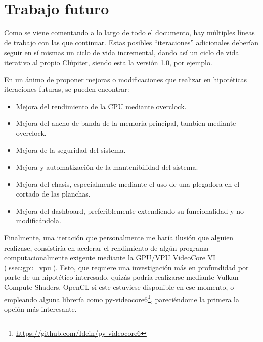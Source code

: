 \section{Trabajo futuro}
Como se viene comentando a lo largo de todo el documento, hay múltiples líneas de trabajo con las que continuar. Estas posibles ``iteraciones'' adicionales deberían seguir en sí mismas un ciclo de vida incremental, dando así un ciclo de vida iterativo al propio Clúpiter, siendo esta la versión 1.0, por ejemplo.

En un ánimo de proponer mejoras o modificaciones que realizar en hipotéticas iteraciones futuras, se pueden encontrar:
\begin{itemize}
    \item Mejora del rendimiento de la CPU mediante \gls{overclock}.
    \item Mejora del ancho de banda de la memoria principal, tambien mediante \gls{overclock}.
    \item Mejora de la seguridad del sistema.
    \item Mejora y automatización de la mantenibilidad del sistema.
    \item Mejora del chasis, especialmente mediante el uso de una plegadora en el cortado de las planchas.
    \item Mejora del dashboard, preferiblemente extendiendo su funcionalidad y no modificándola.
\end{itemize}

Finalmente, una iteración que personalmente me haría ilusión que alguien realizase, consistiría en acelerar el rendimiento de algún programa computacionalmente exigente mediante la GPU/VPU VideoCore VI (\ref{ssec:gpu_vpu}). Esto, que requiere una investigación más en profundidad por parte de un hipotético interesado, quizás podría realizarse mediante Vulkan Compute Shaders, OpenCL si este estuviese disponible en ese momento, o empleando alguna librería como py-videocore6\footnote{\url{https://github.com/Idein/py-videocore6}}, pareciéndome la primera la opción más interesante.